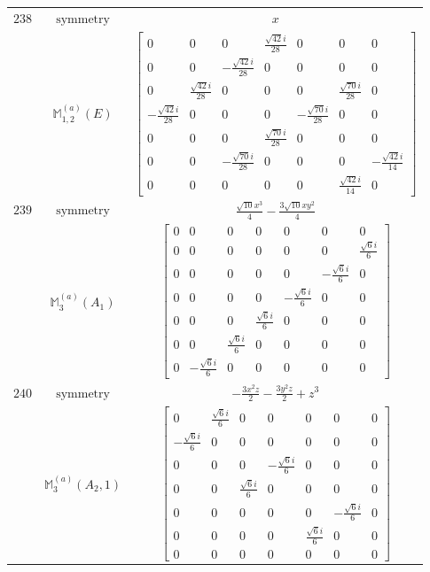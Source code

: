 \documentclass[fleqn,8pt,landscape]{jsarticle}
\begin{document}
\begin{longtable}{ccc}
$ 238 $ & $ \text{symmetry} $ & $ x $ \\
$  $ & $ \mathbb{M}_{1,2}^{(a)}(E) $ & $ \begin{bmatrix} 0 & 0 & 0 & \frac{\sqrt{42} i}{28} & 0 & 0 & 0 \\ 0 & 0 & - \frac{\sqrt{42} i}{28} & 0 & 0 & 0 & 0 \\ 0 & \frac{\sqrt{42} i}{28} & 0 & 0 & 0 & \frac{\sqrt{70} i}{28} & 0 \\ - \frac{\sqrt{42} i}{28} & 0 & 0 & 0 & - \frac{\sqrt{70} i}{28} & 0 & 0 \\ 0 & 0 & 0 & \frac{\sqrt{70} i}{28} & 0 & 0 & 0 \\ 0 & 0 & - \frac{\sqrt{70} i}{28} & 0 & 0 & 0 & - \frac{\sqrt{42} i}{14} \\ 0 & 0 & 0 & 0 & 0 & \frac{\sqrt{42} i}{14} & 0 \end{bmatrix} $ \\ \hline
$ 239 $ & $ \text{symmetry} $ & $ \frac{\sqrt{10} x^{3}}{4} - \frac{3 \sqrt{10} x y^{2}}{4} $ \\
$  $ & $ \mathbb{M}_{3}^{(a)}(A_{1}) $ & $ \begin{bmatrix} 0 & 0 & 0 & 0 & 0 & 0 & 0 \\ 0 & 0 & 0 & 0 & 0 & 0 & \frac{\sqrt{6} i}{6} \\ 0 & 0 & 0 & 0 & 0 & - \frac{\sqrt{6} i}{6} & 0 \\ 0 & 0 & 0 & 0 & - \frac{\sqrt{6} i}{6} & 0 & 0 \\ 0 & 0 & 0 & \frac{\sqrt{6} i}{6} & 0 & 0 & 0 \\ 0 & 0 & \frac{\sqrt{6} i}{6} & 0 & 0 & 0 & 0 \\ 0 & - \frac{\sqrt{6} i}{6} & 0 & 0 & 0 & 0 & 0 \end{bmatrix} $ \\ \hline
$ 240 $ & $ \text{symmetry} $ & $ - \frac{3 x^{2} z}{2} - \frac{3 y^{2} z}{2} + z^{3} $ \\
$  $ & $ \mathbb{M}_{3}^{(a)}(A_{2},1) $ & $ \begin{bmatrix} 0 & \frac{\sqrt{6} i}{6} & 0 & 0 & 0 & 0 & 0 \\ - \frac{\sqrt{6} i}{6} & 0 & 0 & 0 & 0 & 0 & 0 \\ 0 & 0 & 0 & - \frac{\sqrt{6} i}{6} & 0 & 0 & 0 \\ 0 & 0 & \frac{\sqrt{6} i}{6} & 0 & 0 & 0 & 0 \\ 0 & 0 & 0 & 0 & 0 & - \frac{\sqrt{6} i}{6} & 0 \\ 0 & 0 & 0 & 0 & \frac{\sqrt{6} i}{6} & 0 & 0 \\ 0 & 0 & 0 & 0 & 0 & 0 & 0 \end{bmatrix} $ \\ \hline

\end{longtable}
\end{document}
